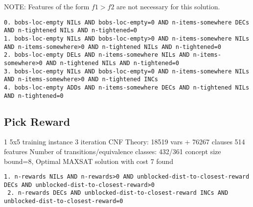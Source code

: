 \documentclass[a4paper]{article}
\begin{document}
NOTE: Features of the form $f1>f2$ are not necessary for this solution.

\begin{Verbatim}[fontsize=\footnotesize]
0. bobs-loc-empty NILs AND bobs-loc-empty=0 AND n-items-somewhere DECs AND n-tightened NILs AND n-tightened=0
1. bobs-loc-empty NILs AND bobs-loc-empty>0 AND n-items-somewhere NILs AND n-items-somewhere>0 AND n-tightened NILs AND n-tightened=0
2. bobs-loc-empty DELs AND n-items-somewhere NILs AND n-items-somewhere>0 AND n-tightened NILs AND n-tightened=0
3. bobs-loc-empty NILs AND bobs-loc-empty=0 AND n-items-somewhere NILs AND n-items-somewhere>0 AND n-tightened INCs
4. bobs-loc-empty ADDs AND n-items-somewhere DECs AND n-tightened NILs AND n-tightened=0
\end{Verbatim}

\subsection{Pick Reward}
1 5x5 training instance
3 iteration
CNF Theory: 18519 vars + 76267 clauses
514 features
Number of transitions/equivalence classes: 432/361
concept size bound=8,
Optimal MAXSAT solution with cost 7 found

\begin{Verbatim}[fontsize=\footnotesize]
 1. n-rewards NILs AND n-rewards>0 AND unblocked-dist-to-closest-reward DECs AND unblocked-dist-to-closest-reward>0
 2. n-rewards DECs AND unblocked-dist-to-closest-reward INCs AND unblocked-dist-to-closest-reward=0
\end{Verbatim}




\end{document}
